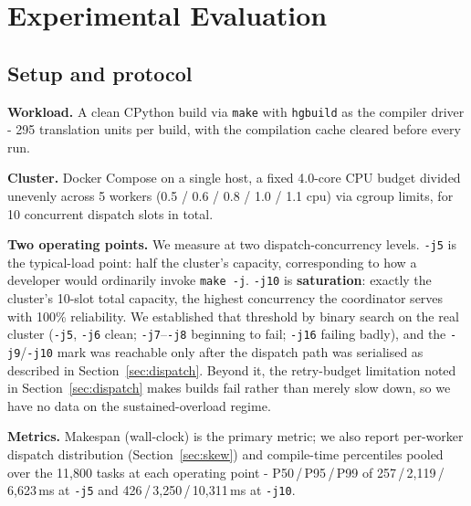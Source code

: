 \documentclass[final,5p,times,twocolumn]{elsarticle}
\begin{document}
\section{Experimental Evaluation}
\label{sec:eval}

\subsection{Setup and protocol}
\label{sec:setup}

\textbf{Workload.} A clean CPython build via \texttt{make} with \texttt{hgbuild} as the compiler driver - 295 translation units per build, with the compilation cache cleared before every run.

\textbf{Cluster.} Docker Compose on a single host, a fixed 4.0-core CPU budget divided unevenly across 5 workers (0.5 / 0.6 / 0.8 / 1.0 / 1.1 cpu) via cgroup limits, for 10 concurrent dispatch slots in total.

\textbf{Two operating points.} We measure at two dispatch-concurrency levels. \texttt{-j5} is the typical-load point: half the cluster's capacity, corresponding to how a developer would ordinarily invoke \texttt{make -j}. \texttt{-j10} is \textbf{saturation}: exactly the cluster's 10-slot total capacity, the highest concurrency the coordinator serves with 100\% reliability. We established that threshold by binary search on the real cluster (\texttt{-j5}, \texttt{-j6} clean; \texttt{-j7}--\texttt{-j8} beginning to fail; \texttt{-j16} failing badly), and the \texttt{-j9}/\texttt{-j10} mark was reachable only after the dispatch path was serialised as described in Section~\ref{sec:dispatch}. Beyond it, the retry-budget limitation noted in Section~\ref{sec:dispatch} makes builds fail rather than merely slow down, so we have no data on the sustained-overload regime.

\textbf{Metrics.} Makespan (wall-clock) is the primary metric; we also report per-worker dispatch distribution (Section~\ref{sec:skew}) and compile-time percentiles pooled over the 11{,}800 tasks at each operating point - P50\,/\,P95\,/\,P99 of 257\,/\,2{,}119\,/\,6{,}623\,ms at \texttt{-j5} and 426\,/\,3{,}250\,/\,10{,}311\,ms at \texttt{-j10}.
\end{document}
